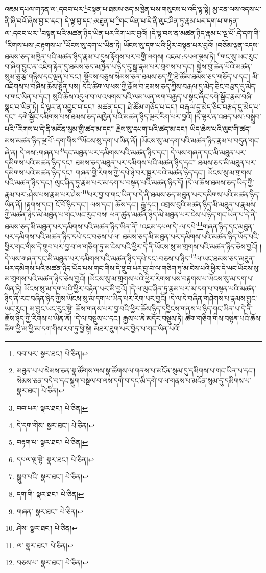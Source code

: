 འཇམ་དཔལ་གཏན་ལ་:དབབ་པར་\footnote{བབ་པར་  སྣར་ཐང་།  པེ་ཅིན། }བསྟན་པ་ཐམས་ཅད་མཁྱེན་པས་གསུངས་པ་འདི་ལྟ་སྟེ། མྱ་ངན་ལས་འདས་པ་ནི་ཞི་བའོ་ཞེས་བྱ་བ་དང་། དེ་ལྟ་བུ་དང་:མཐུན་པ་\footnote{མཐུན་པ་པ་སེམས་ཅན་སྣ་ཚོགས་ལས་སྣ་ཚོགས་ལ་གནས་པ་མངོན་སུམ་དུ་དམིགས་པ་གང་ཡིན་པ་དང་། སེམས་ཅན་བདེ་བ་དང་སྡུག་བསྔལ་བ་ལས་དགེ་བ་དང་མི་དགེ་བ་ལ་གནས་པ་མངོན་སུམ་དུ་དམིགས་པ་  སྣར་ཐང་།  པེ་ཅིན། }གང་ཡིན་པ་དེ་ནི་ལུང་ཤིན་ཏུ་རྣམ་པར་དག་པ་གཏན་ལ་:དབབ་པར་\footnote{བབ་པར་  སྣར་ཐང་།  པེ་ཅིན། }བསྟན་པའི་མཚན་ཉིད་ཡིན་པར་རིག་པར་བྱའོ། །དེ་ལྟ་བས་ན་མཚན་ཉིད་རྣམ་པ་ལྔ་པོ་:དེ་དག་གི་\footnote{དེ་དག་གིས་  སྣར་ཐང་།  པེ་ཅིན། }རིགས་པས་:བརྟགས་པ་\footnote{བརྟག་པ་  སྣར་ཐང་།  པེ་ཅིན། }ཡོངས་སུ་དག་པ་ཡིན་ཏེ། ཡོངས་སུ་དག་པའི་ཕྱིར་བསྟན་པར་བྱའོ། །བཅོམ་ལྡན་འདས་ཐམས་ཅད་མཁྱེན་པའི་མཚན་ཉིད་རྣམ་པ་དུས་རྟོགས་པར་བགྱི་ལགས། འཇམ་:དཔལ་ལྔས་ཏེ། \footnote{དཔལ་ལྔ་སྟེ་  སྣར་ཐང་།  པེ་ཅིན། }གང་སུ་ཡང་རུང་བ་ཞིག་བྱུང་ན་འཇིག་རྟེན་དུ་ཐམས་ཅད་མཁྱེན་པ་ཉིད་དུ་སྒྲ་རྣམ་པར་གྲགས་པ་དང་། སྐྱེས་བུ་ཆེན་པོའི་མཚན་སུམ་ཅུ་རྩ་གཉིས་དང་ལྡན་པ་དང་། སྟོབས་བཅུས་སེམས་ཅན་ཐམས་ཅད་ཀྱི་ཐེ་ཚོམ་ཐམས་ཅད་གཅོད་པ་དང་། མི་འཇིགས་པ་བཞིས་ཆོས་སྟོན་པས། དེའི་ཚིག་ལ་ཕས་ཀྱི་རྒོལ་བ་ཐམས་ཅད་ཀྱིས་བརྒལ་དུ་མེད་ཅིང་བརྩད་དུ་མེད་པ་གང་ཡིན་པ་དང་། སུའི་ཆོས་འདུལ་བ་ལ་འཕགས་པའི་ལམ་ཡན་ལག་བརྒྱད་པ་སྣང་ཞིང་དགེ་སྦྱོང་རྣམ་བཞི་སྣང་བ་ཡིན་ཏེ། དེ་ལྟར་ན་འབྱུང་བ་དང་། མཚན་དང་། ཐེ་ཚོམ་གཅོད་པ་དང་། བརྒལ་དུ་མེད་ཅིང་བརྩད་དུ་མེད་པ་དང་། དགེ་སྦྱོང་དམིགས་པས་ཐམས་ཅད་མཁྱེན་པའི་མཚན་ཉིད་ལྔར་རིག་པར་བྱའོ། །དེ་ལྟར་ན་འཐད་པས་:བསྒྲུབ་པའི་\footnote{སྒྲུབ་པའི་  སྣར་ཐང་།  པེ་ཅིན། }རིགས་པ་དེ་ནི་མངོན་སུམ་གྱི་ཚད་མ་དང་། རྗེས་སུ་དཔག་པའི་ཚད་མ་དང་། ཡིད་ཆེས་པའི་ལུང་གི་ཚད་མས་མཚན་ཉིད་ལྔ་པོ་:དག་གིས་\footnote{དག་གི་  སྣར་ཐང་།  པེ་ཅིན། }ཡོངས་སུ་དག་པ་ཡིན་ནོ། །ཡོངས་སུ་མ་དག་པའི་མཚན་ཉིད་རྣམ་པ་བདུན་གང་ཞེ་ན། དེ་ལས་:གཞན་པ་\footnote{གཞན་  སྣར་ཐང་།  པེ་ཅིན། }དང་མཐུན་པར་དམིགས་པའི་མཚན་ཉིད་དང་། དེ་ལས་གཞན་དང་མི་མཐུན་པར་དམིགས་པའི་མཚན་ཉིད་དང་། ཐམས་ཅད་མཐུན་པར་དམིགས་པའི་མཚན་ཉིད་དང་། ཐམས་ཅད་མི་མཐུན་པར་དམིགས་པའི་མཚན་ཉིད་དང་། གཞན་གྱི་རིགས་ཀྱི་དཔེ་ཉེ་བར་སྦྱར་བའི་མཚན་ཉིད་དང་། ཡོངས་སུ་མ་གྲགས་པའི་མཚན་ཉིད་དང་། ལུང་ཤིན་ཏུ་རྣམ་པར་མ་དག་པ་བསྟན་པའི་མཚན་ཉིད་དོ། །དེ་ལ་ཆོས་ཐམས་ཅད་ཡིད་ཀྱི་རྣམ་པར་:ཤེས་པས་རྣམ་པར་ཤེས་\footnote{ཤེས་  སྣར་ཐང་།  པེ་ཅིན། }པར་བྱ་བ་གང་ཡིན་པ་དེ་ནི་ཐམས་ཅད་མཐུན་པར་དམིགས་པའི་མཚན་ཉིད་ཡིན་ནོ། །རྟགས་དང་། ངོ་བོ་ཉིད་དང་། ལས་དང་། ཆོས་དང་། རྒྱུ་དང་། འབྲས་བུའི་མཚན་ཉིད་མི་མཐུན་པ་རྣམས་ཀྱི་མཚན་ཉིད་མི་མཐུན་པ་གང་ཡང་རུང་བས། ཕན་ཚུན་མཚན་ཉིད་མི་མཐུན་པར་ངེས་པ་ཉིད་གང་ཡིན་པ་དེ་ནི་ཐམས་ཅད་མི་མཐུན་པར་དམིགས་པའི་མཚན་ཉིད་ཡིན་ནོ། །འཇམ་དཔལ་དེ་:ལ་དཔེ་\footnote{ལ་  སྣར་ཐང་།  པེ་ཅིན། }གཞན་ཉིད་དང་མཐུན་པར་དམིགས་པའི་མཚན་ཉིད་དཔེ་དང་བཅས་པ་ལ། ཐམས་ཅད་མི་མཐུན་པར་དམིགས་པའི་མཚན་ཉིད་ཡོད་པའི་ཕྱིར་གང་གིས་དེ་གྲུབ་པར་བྱ་བ་ལ་གཅིག་ཏུ་མ་ངེས་པའི་ཕྱིར་དེ་ནི་ཡོངས་སུ་མ་གྲགས་པའི་མཚན་ཉིད་ཅེས་བྱའོ། །དེ་ལས་གཞན་དང་མི་མཐུན་པར་དམིགས་པའི་མཚན་ཉིད་དཔེ་དང་:བཅས་པ་ཉིད་\footnote{བཅས་པ་  སྣར་ཐང་།  པེ་ཅིན། }ལ་ཡང་ཐམས་ཅད་མཐུན་པར་དམིགས་པའི་མཚན་ཉིད་ཡོད་པས་གང་གིས་དེ་གྲུབ་པར་བྱ་བ་ལ་གཅིག་ཏུ་མ་ངེས་པའི་ཕྱིར་དེ་ཡང་ཡོངས་སུ་མ་གྲགས་པའི་མཚན་ཉིད་ཅེས་བྱའོ། །ཡོངས་སུ་མ་གྲགས་པའི་ཕྱིར་རིགས་པས་བརྟགས་པ་ཡོངས་སུ་མ་དག་པ་ཡིན་ཏེ། ཡོངས་སུ་མ་དག་པའི་ཕྱིར་བརྟེན་པར་མི་བྱའོ། །དེ་ལ་ལུང་ཤིན་ཏུ་རྣམ་པར་མ་དག་པ་བསྟན་པའི་མཚན་ཉིད་ནི་རང་བཞིན་ཉིད་ཀྱིས་ཡོངས་སུ་མ་དག་པ་ཡིན་པར་རིག་པར་བྱའོ། །དེ་ལ་དེ་བཞིན་གཤེགས་པ་རྣམས་བྱུང་ཡང་རུང་། མ་བྱུང་ཡང་རུང་སྟེ། ཆོས་གནས་པར་བྱ་བའི་ཕྱིར་ཆོས་ཉིད་དབྱིངས་གནས་པ་ཉིད་གང་ཡིན་པ་དེ་ནི་ཆོས་ཉིད་ཀྱི་རིགས་པ་ཡིན་ནོ། །དེ་ལ་བསྡུས་པ་དང་། རྒྱས་པ་ནི་མདོར་བསྡུས་ཏེ། ཚིག་གཅིག་གིས་བསྟན་པའི་ཆོས་ཚིག་ཕྱི་མ་ཕྱི་མ་དག་གིས་རབ་ཏུ་ཕྱེ་སྟེ། མཐར་ཐུག་པར་བྱེད་པ་གང་ཡིན་པའོ། 